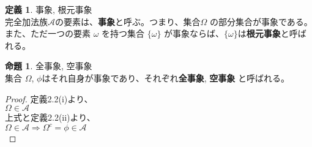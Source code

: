 \documentclass[dvipdfmx,10pt, a4j]{jarticle}
\theoremstyle{definition}
\newtheorem{definition}{定義}[section]
\newtheorem{proposition}[theorem]{命題}
\begin{document}
    \clearpage
    \begin{definition} 事象, 根元事象\\
    完全加法族$\mathcal{A}$の要素は、\textbf{事象}と呼ぶ。つまり、集合$\Omega$ の部分集合が事象である。\\
    また、ただ一つの要素 $\omega$ を持つ集合 $\{ \omega \}$ が事象ならば、$\{ \omega \}$は\textbf{根元事象}と呼ばれる。
    \begin{proposition} 全事象, 空事象\\
        集合 $\Omega$, $\phi$はそれ自身が事象であり、それぞれ\textbf{全事象}, \textbf{空事象} と呼ばれる。
    \end{proposition}
    \begin{proof}
        定義2.2(i)より、\\
        $\Omega \in \mathcal{A}$\\
        上式と定義2.2(ii)より、\\
        $\Omega \in \mathcal{A} \Rightarrow \Omega^{c} = \phi \in \mathcal{A}$\\
    \end{proof}
    \end{definition}
\end{document}
